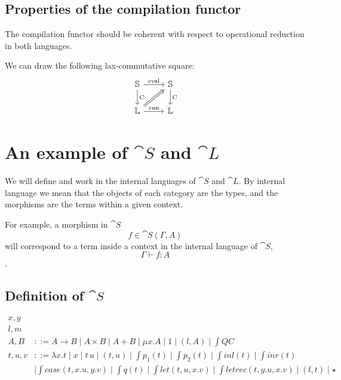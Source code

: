 
\subsection{Properties of the compilation functor}

The compilation functor should be coherent with respect to operational
reduction in both languages.

We can draw the following lax-commutative square:
\begin{equation}
  \begin{tikzcd}
    \cat S \arrow[r, "\mathrm{eval}"] \arrow[d, "\fun C"] & \cat S \arrow[d, "\fun C"] \\
    \cat L \arrow[r, "\mathrm{run}"]  \arrow[Rightarrow,ur]                   & \cat L
  \end{tikzcd}
\end{equation}

\section{An example of $\cat S$ and $\cat L$}

We will define and work in the internal languages of $\cat S$ and $\cat L$. By
internal language we mean that the objects of each category are the types, and
the morphisms are the terms within a given context.

For example, a morphism in $\cat S$ $$ f \in \cat S (\Gamma, A) $$ will
correspond to a term inside a context in the internal language of $\cat S$, $$
  \Gamma \vdash f : A $$.

\subsection{Definition of $\cat S$}

\begin{align*}
  x,y  \tag{variables}                                                                                                                               \\
  l,m  \tag{labels}                                                                                                                                  \\
  A, B    & ::=  A \to B \mid A \times B \mid A + B \mid \mu x . A \mid 1 \mid (l, A) \mid \int{Q} C \tag{types}                                     \\
  t, u, v & ::= \lambda x . t \mid x \mid t\,u \mid (t, u) \mid \int{p}_1(t) \mid \int{p}_2(t) \mid \int{inl}(t) \mid \int{inr}(t)                   \\
          & \mid \int{case}(t, x.u, y.v) \mid \int{q}(t) \mid \int{let}(t, u, x.v) \mid \int{letrec}(t, y.u, x.v) \mid (l, t) \mid \star \tag{terms}
\end{align*}

